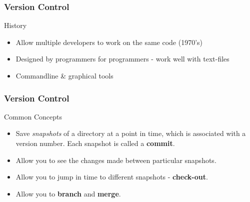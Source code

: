 \documentclass{beamer}
\begin{document}
\begin{frame}
\frametitle{Version Control}

\begin{block}
{History}
\begin{itemize}
\item Allow multiple developers to work on the same code (1970's)
\item Designed by programmers for programmers - work well with text-files
\item Commandline \& graphical tools
\end{itemize}
\end{block}

\end{frame}


\begin{frame}
\frametitle{Version Control}


\begin{block}
{Common Concepts}
\begin{itemize}
\item Save \emph{snapshots} of a directory at a point in time, which is associated with a version number. Each snapshot is called a {\bf{commit}}. 
\item Allow you to see the changes made between particular snapshots.
\item Allow you to jump in time to different snapshots - {\bf{check-out}}. 
\item Allow you to {\bf{branch}} and {\bf{merge}}.
\end{itemize}
\end{block}
\end{frame}
\end{document}
